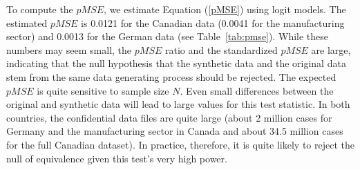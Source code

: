 

To compute the $pMSE$, we estimate Equation (\ref{pMSE}) using logit models. The estimated $pMSE$ is 0.0121 for the Canadian data (0.0041 for the manufacturing sector) and 0.0013 for the German data (see Table~\ref{tab:pmse}). While these numbers may seem small, the $pMSE$ ratio and the standardized $pMSE$ are large, indicating that the null hypothesis that the synthetic data and the original data stem from the same data generating process should be rejected. The expected $pMSE$ is quite sensitive to sample size $N$. Even small differences between the original and synthetic data will lead to large values for this test statistic. In both countries, the confidential data files are quite large (about 2 million cases for Germany and the manufacturing sector in Canada and about 34.5 million cases for the full Canadian dataset). In practice, therefore, it is quite likely to reject the null of equivalence  given this test's very high power. 





